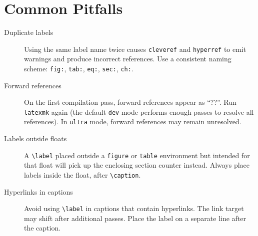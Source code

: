 \section{Common Pitfalls}

\begin{description}
  \item[Duplicate labels] Using the same label name twice causes
    \texttt{cleveref} and \texttt{hyperref} to emit warnings and
    produce incorrect references.  Use a consistent naming scheme:
    \verb|fig:|, \verb|tab:|, \verb|eq:|, \verb|sec:|, \verb|ch:|.

  \item[Forward references] On the first compilation pass, forward
    references appear as ``??''.  Run \texttt{latexmk} again (the
    default \texttt{dev} mode performs enough passes to resolve all
    references).  In \texttt{ultra} mode, forward references may
    remain unresolved.

  \item[Labels outside floats] A \verb|\label| placed outside a
    \texttt{figure} or \texttt{table} environment but intended for that
    float will pick up the enclosing section counter instead.  Always
    place labels inside the float, after \verb|\caption|.

  \item[Hyperlinks in captions] Avoid using \verb|\label| in captions
    that contain hyperlinks.  The link target may shift after additional
    passes.  Place the label on a separate line after the caption.
\end{description}
